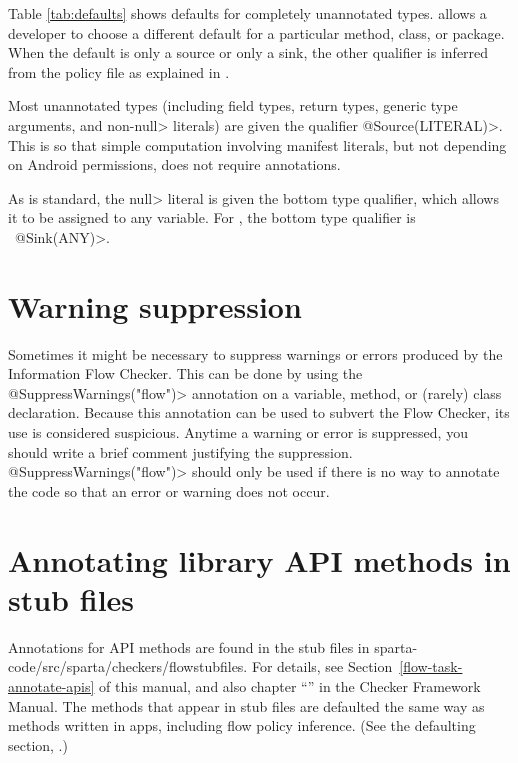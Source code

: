 Table \ref{tab:defaults} shows defaults for completely unannotated types.
\TheFlowChecker allows a developer to choose a different default for a
particular method, class, or package.
When the default is only a source or only a sink, the other qualifier is
inferred from the policy file as explained in
.

Most unannotated types (including field types, return
types, generic type arguments, and non-\<null>
literals) are given the qualifier \<@Source(LITERAL)>.  
This is so that simple computation involving manifest literals, but not
depending on Android permissions, does not require 
annotations. 

As is standard, the \<null> literal is given the bottom type qualifier, which allows it to be assigned to any variable.
For \theFlowChecker, the bottom type qualifier is \srcnone\  \<@Sink(ANY)>.



\section{Warning suppression\label{sec:waringsuppression}}
 
Sometimes it might be necessary to suppress warnings or errors produced by
the Information Flow Checker.  This can be done by using the
\<@SuppressWarnings("flow")> annotation on a variable, method, or (rarely)
class declaration.  Because this annotation can be used to subvert the Flow
Checker, its use is considered suspicious.  Anytime a warning or error is
suppressed, you should write a brief comment justifying the suppression.
\<@SuppressWarnings("flow")> should only be used if there is no way to
annotate the code so that an error or warning does not occur.  

\section{Annotating library API methods in stub files\label{sec:apispecs}}

Annotations for API methods are found in the stub files in sparta-code/src/sparta/checkers/flowstubfiles.
For details, see Section~\ref{flow-task-annotate-apis} of this manual, and also 
chapter
``'' in the Checker Framework Manual.  
 The methods that appear in stub files are defaulted the same way as methods 
written in apps, including flow policy inference.  
(See the defaulting section, .) 

